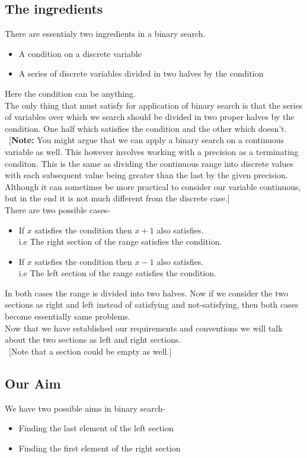 \documentclass[12pt]{article}
\begin{document}
\begin{large}
\subsection{The ingredients}
There are essentialy two ingredients in a binary search.
\begin{itemize}
	\item{A condition on a discrete variable}
	\item{A series of discrete variables divided in two halves by the condition}
\end{itemize}
Here the condition can be anything.\\
The only thing that must satisfy for application of binary search is that the series of variables over which we search should be divided in two proper halves by the condition. One half which satisfies the condition and the other which doesn't.\\
\ [\textbf{Note:} You might argue that we can apply a binary search on a continuous variable as well. This however involves working with a precision as a terminating conditon. This is the same as dividing the continuous range into discrete values with each subsequent value being greater than the last by the given precision. Although it can sometimes be more practical to consider our variable continuous, but in the end it is not much different from the discrete case.]\\
There are two possible cases-
\begin{itemize}
	\item {If $x$ satisfies the condition then $x+1$ also satisfies.\\i.e The right section of the range satisfies the condition.}
	\item {If $x$ satisfies the condition then $x-1$ also satisfies.\\i.e The left section of the range satisfies the condition.}
\end{itemize}
In both cases the range is divided into two halves. Now if we consider the two sections as right and left instead
of satisfying and not-satisfying, then both cases become essentially same problems.\\
Now that we have established our requirements and conventions we will talk about the two sections as left and
right sections.\\
\ [Note that a section could be empty as well.]
\subsection{Our Aim}
We have two possible aims in binary search-
\begin{itemize}
	\item{Finding the last element of the left section}
	\item{Finding the first element of the right section}
\end{itemize}

\end{large}
\end{document}
